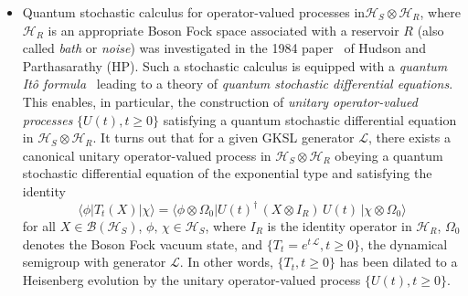 \begin{itemize}
\item Quantum stochastic calculus for operator-valued processes in\break $\mathcal{H}_S\otimes\mathcal{H}_R$, where $\mathcal{H}_R$ is an appropriate Boson Fock space associated with a reservoir $R$ (also called {\it bath} or {\it noise}) was investigated in the 1984 paper~\cite{chap8-key7} of Hudson and Parthasarathy (HP). Such a stochastic calculus is equipped with a {\it quantum It{\^o} formula}~\cite{chap8-key7,chap8-key8} leading to a theory of {\it quantum stochastic differential equations}. This enables, in particular, the construction of {\it unitary operator-valued processes} $\{U(t), t\geq 0\}$ satisfying a quantum stochastic differential equation in $\mathcal{H}_S\otimes\mathcal{H}_R$. It turns out that for a given GKSL generator $\mathcal{L}$, there exists a canonical unitary operator-valued process in $\mathcal{H}_S\otimes\mathcal{H}_R$ obeying a quantum stochastic differential equation of the exponential type and satisfying the identity 
$$
\langle \phi\vert T_t(X)\vert \chi \rangle=\langle \phi\otimes \Omega_0\vert U(t)^\dag\, (X\otimes I_R)\, U(t)\,\vert \chi\otimes \Omega_0 \rangle
$$ 
for all $X\in \mathcal{B}(\mathcal{H}_S)$, $\phi,\, \chi\in \mathcal{H}_S$, where  $I_R$ is the identity operator in $\mathcal{H}_R$, $\Omega_0$ denotes the  Boson Fock vacuum state,  and $\{T_t=e^{t\,\mathcal{L}}, t\geq 0\}$, the dynamical semigroup with generator $\mathcal{L}$. In other words,  $\{T_t,t\geq 0\}$ has been dilated to a Heisenberg evolution by the unitary operator-valued process $\{U(t), t\geq 0\}$. 


\end{itemize}
